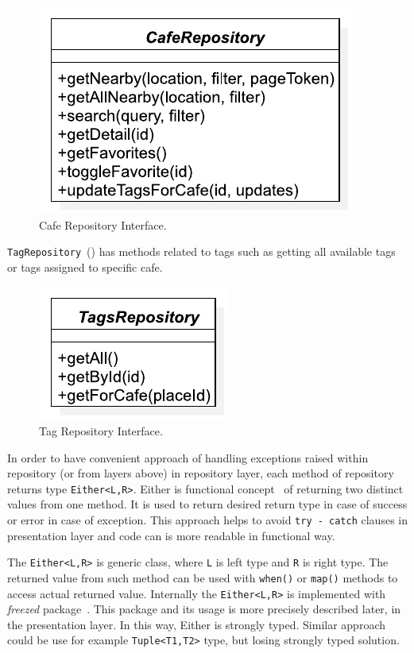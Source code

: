 \begin{figure}[ht]
    \centering
    \includegraphics[width=0.5\linewidth]{img/implementation/cafe_repository_interface.pdf}
    \caption{Cafe Repository Interface.}
    \label{fig:ct-cafe-repo-interface}
\end{figure}

\verb|TagRepository|~() has methods related to tags such as getting all available tags or tags assigned to specific cafe. 

\begin{figure}[ht]
    \centering
    \includegraphics[width=0.33\linewidth]{img/implementation/tag_repository_interface.pdf}
    \caption{Tag Repository Interface.}
    \label{fig:ct-tag-repo-interface}
\end{figure}

In order to have convenient approach of handling exceptions raised within repository (or from layers above) in repository layer, each method of repository returns type \verb|Either<L,R>|. Either is functional concept~\cite{ibm-either} of returning two distinct values from one method. It is used to return desired return type in case of success or error in case of exception. This approach helps to avoid \verb|try - catch| clauses in presentation layer and code can is more readable in functional way. 

The \verb|Either<L,R>| is generic class, where \verb|L| is left type and \verb|R| is right type. The returned value from such method can be used with \verb|when()| or \verb|map()| methods to access actual returned value. Internally the \verb|Either<L,R>| is implemented with \textit{freezed} package~\cite{package-freezed}. This package and its usage is more precisely described later, in the presentation layer. In this way, Either is strongly typed. Similar approach could be use for example \verb|Tuple<T1,T2>| type, but losing strongly typed solution. 

